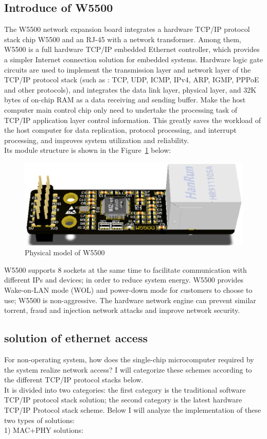 \subsection{Introduce of W5500}
\label{sec:Introduce of W5500}
The W5500 network expansion board integrates a hardware TCP/IP protocol stack chip W5500 and an RJ-45 with a network transformer. Among them, W5500 is a full hardware TCP/IP embedded Ethernet controller, which provides a simpler Internet connection solution for embedded systems. Hardware logic gate circuits are used to implement the transmission layer and network layer of the TCP/IP protocol stack (such as : TCP, UDP, ICMP, IPv4, ARP, IGMP, PPPoE and other protocols), and integrates the data link layer, physical layer, and 32K bytes of on-chip RAM as a data receiving and sending buffer. Make the host computer main control chip only need to undertake the processing task of TCP/IP application layer control information. This greatly saves the workload of the host computer for data replication, protocol processing, and interrupt processing, and improves system utilization and reliability. 
\\
Its module structure is shown in the Figure~\ref{fig:2.6} below:
\\
\begin{figure}[h]
	\centering
	\includegraphics[width=15cm] {grafiken/2.6.eps}
	\caption{Physical model of W5500} 
	\label{fig:2.6}
\end{figure}
W5500 supports 8 sockets at the same time to facilitate communication with different IPs and devices; in order to reduce system energy. W5500 provides Wake-on-LAN mode (WOL) and power-down mode for customers to choose to use; W5500 is non-aggressive. The hardware network engine can prevent similar torrent, fraud and injection network attacks and improve network security.

\subsection{solution of ethernet access}
\label{sec:solution of ethernet access}
For non-operating system, how does the single-chip microcomputer required by the system realize network access? I will categorize these schemes according to the different TCP/IP protocol stacks below.
\\
It is divided into two categories: the first category is the traditional software TCP/IP protocol stack solution; the second category is the latest hardware TCP/IP
Protocol stack scheme. Below I will analyze the implementation of these two types of solutions: 
\\
1) MAC+PHY solutions:

